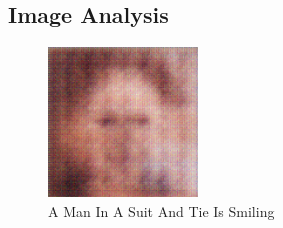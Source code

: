 \documentclass{article}%
\begin{document}
%
\subsection{Image Analysis}%
\label{subsec:ImageAnalysis}%


\begin{figure}[h!]%
\centering%
\includegraphics[width=150px]{500_fake_images/samples_5_78.png}%
\caption{A Man In A Suit And Tie Is Smiling}%
\end{figure}

%
\end{document}

